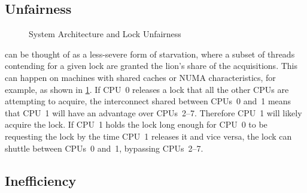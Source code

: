 \subsection{Unfairness}
\label{sec:locking:Unfairness}

\begin{figure}
\centering
{}
\caption{System Architecture and Lock Unfairness}
\label{fig:locking:System Architecture and Lock Unfairness}
\end{figure}

 can be thought of as a less-severe form of starvation,
where a subset of threads contending for a given lock are granted
the lion's share of the acquisitions.
This can happen on machines with shared caches or NUMA characteristics,
for example, as shown in
\cref{fig:locking:System Architecture and Lock Unfairness}.
If CPU~0 releases a lock that all the other CPUs are attempting
to acquire, the interconnect shared between CPUs~0 and~1 means that
CPU~1 will have an advantage over CPUs~2--7.
Therefore CPU~1 will likely acquire the lock.
If CPU~1 holds the lock long enough for CPU~0 to be requesting the
lock by the time CPU~1 releases it and vice versa, the lock can
shuttle between CPUs~0 and~1, bypassing CPUs~2--7.

\QuickQuizEnd

\subsection{Inefficiency}
\label{sec:locking:Inefficiency}

